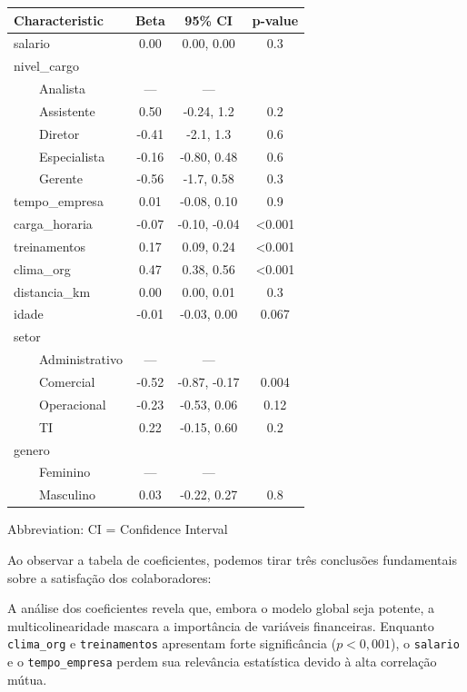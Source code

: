 \documentclass[
  letterpaper,
  DIV=11,
  numbers=noendperiod]{scrartcl}
\begin{document}
\begin{table}
\fontsize{12.0pt}{14.0pt}\selectfont
\begin{tabular*}{\linewidth}{@{\extracolsep{\fill}}lccc}
\toprule
\textbf{Characteristic} & \textbf{Beta} & \textbf{95\% CI} & \textbf{p-value} \\ 
\midrule\addlinespace[2.5pt]
salario & 0.00 & 0.00, 0.00 & 0.3 \\ 
nivel\_cargo &  &  &  \\ 
    Analista & — & — &  \\ 
    Assistente & 0.50 & -0.24, 1.2 & 0.2 \\ 
    Diretor & -0.41 & -2.1, 1.3 & 0.6 \\ 
    Especialista & -0.16 & -0.80, 0.48 & 0.6 \\ 
    Gerente & -0.56 & -1.7, 0.58 & 0.3 \\ 
tempo\_empresa & 0.01 & -0.08, 0.10 & 0.9 \\ 
carga\_horaria & -0.07 & -0.10, -0.04 & <0.001 \\ 
treinamentos & 0.17 & 0.09, 0.24 & <0.001 \\ 
clima\_org & 0.47 & 0.38, 0.56 & <0.001 \\ 
distancia\_km & 0.00 & 0.00, 0.01 & 0.3 \\ 
idade & -0.01 & -0.03, 0.00 & 0.067 \\ 
setor &  &  &  \\ 
    Administrativo & — & — &  \\ 
    Comercial & -0.52 & -0.87, -0.17 & 0.004 \\ 
    Operacional & -0.23 & -0.53, 0.06 & 0.12 \\ 
    TI & 0.22 & -0.15, 0.60 & 0.2 \\ 
genero &  &  &  \\ 
    Feminino & — & — &  \\ 
    Masculino & 0.03 & -0.22, 0.27 & 0.8 \\ 
\bottomrule
\end{tabular*}
\begin{minipage}{\linewidth}
\vspace{.05em}
Abbreviation: CI = Confidence Interval\\
\end{minipage}
\end{table}

Ao observar a tabela de coeficientes, podemos tirar três conclusões
fundamentais sobre a satisfação dos colaboradores:

A análise dos coeficientes revela que, embora o modelo global seja
potente, a multicolinearidade mascara a importância de variáveis
financeiras. Enquanto \texttt{clima\_org} e \texttt{treinamentos}
apresentam forte significância (\(p < 0,001\)), o \texttt{salario} e o
\texttt{tempo\_empresa} perdem sua relevância estatística devido à alta
correlação mútua.
\end{document}
